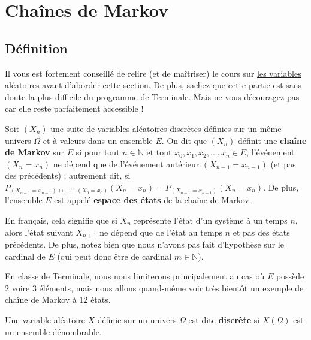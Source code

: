 	\section{Chaînes de Markov}

	\subsection{Définition}

	Il vous est fortement conseillé de relire (et de maîtriser) le cours sur \href{https://bacomathiqu.es/cours/terminale/variables-aleatoires-concentration-grands-nombres/}{les variables aléatoires} avant d'aborder cette section. De plus, sachez que cette partie est sans doute la plus difficile du programme de Terminale. Mais ne vous découragez pas car elle reste parfaitement accessible !

	\begin{formula}[Définition]
		Soit $(X_n)$ une suite de variables aléatoires discrètes définies sur un même univers $\Omega$ et à valeurs dans un ensemble $E$. On dit que $(X_n)$ définit une \textbf{chaîne de Markov} sur $E$ si pour tout $n \in \mathbb{N}$ et tout $x_0, x_1, x_2, \dots, x_n \in E$, l'événement $(X_n = x_n)$ ne dépend que de l'événement antérieur $(X_{n-1} = x_{n-1})$ (et pas des précédents) ; autrement dit, si $P_{(X_{n-1} = x_{n-1}) \, \cap \dots \cap \, (X_0 = x_0)}(X_n = x_n) = P_{(X_{n-1} = x_{n-1})}(X_n = x_n)$.
		\newpar
		De plus, l'ensemble $E$ est appelé \textbf{espace des états} de la chaîne de Markov.
	\end{formula}

	En français, cela signifie que si $X_n$ représente l'état d'un système à un temps $n$, alors l'état suivant $X_{n+1}$ ne dépend que de l'état au temps $n$ et pas des états précédents.
	De plus, notez bien que nous n'avons pas fait d'hypothèse sur le cardinal de $E$ (qui peut donc être de cardinal $m \in \mathbb{N}$).
	\begin{nosummary}
		\newpar
		En classe de Terminale, nous nous limiterons principalement au cas où $E$ possède $2$ voire $3$ éléments, mais nous allons quand-même voir très bientôt un exemple de chaîne de Markov à $12$ états.
	\end{nosummary}

	\begin{tip}
		Une variable aléatoire $X$ définie sur un univers $\Omega$ est dite \textbf{discrète} si $X(\Omega)$ est un ensemble dénombrable.
	\end{tip}

